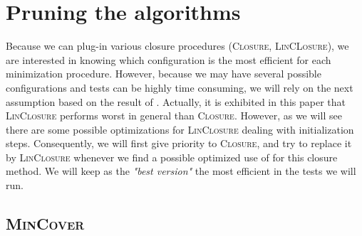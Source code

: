 \section{Pruning the algorithms}

Because we can plug-in various closure procedures (\textsc{Closure}, \textsc{LinCLosure}), we are interested in knowing which configuration is
the most efficient for each minimization procedure. However, because we may
have several possible configurations and tests can be highly time consuming,
we will rely on the next assumption based on the result of \cite{bazhanov_optimizations_2014}. Actually, it is exhibited in this paper
that \textsc{LinClosure} performs worst in general than \textsc{Closure}. However, as we will see there are some possible optimizations for \textsc{LinClosure} dealing with initialization steps. Consequently, 
we will first give priority to \textsc{Closure}, and try to replace it 
by \textsc{LinClosure} whenever we find a possible optimized use of 
for this closure method. We will keep as the \textit{"best version"} the most efficient in the tests we will run.

\subsection{\textsc{MinCover}}

